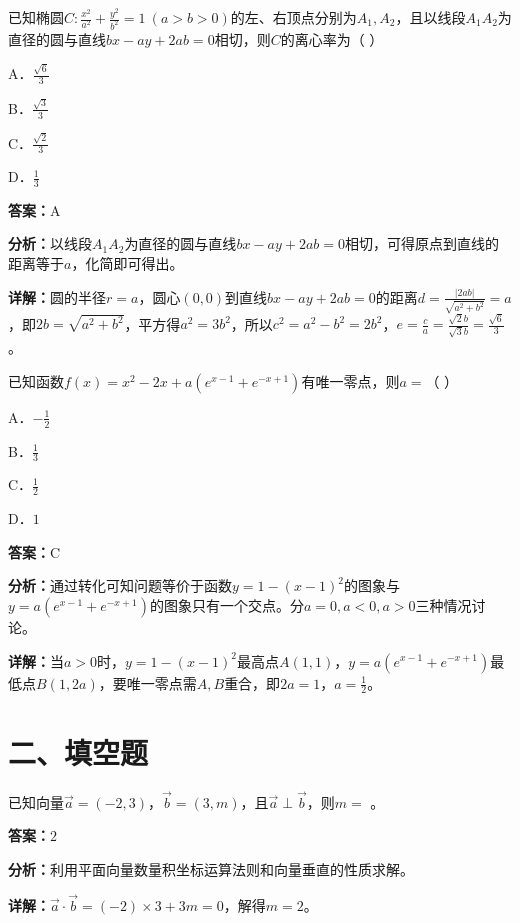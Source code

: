 \begin{question}[points=5]
已知椭圆$C:\frac{x^2}{a^2}+\frac{y^2}{b^2}=1\ (a>b>0)$的左、右顶点分别为$A_1,A_2$，且以线段$A_1A_2$为直径的圆与直线$bx-ay+2ab=0$相切，则$C$的离心率为（              ）
\begin{choices}
  \item A．$\frac{\sqrt{6}}{3}$
  \item B．$\frac{\sqrt{3}}{3}$
  \item C．$\frac{\sqrt{2}}{3}$
  \item D．$\frac{1}{3}$
\end{choices}
\begin{solution}
\textbf{答案：}A

\textbf{分析：}以线段$A_1A_2$为直径的圆与直线$bx-ay+2ab=0$相切，可得原点到直线的距离等于$a$，化简即可得出。

\textbf{详解：}圆的半径$r=a$，圆心$(0,0)$到直线$bx-ay+2ab=0$的距离$d=\frac{|2ab|}{\sqrt{a^2+b^2}}=a$，即$2b=\sqrt{a^2+b^2}$，平方得$a^2=3b^2$，所以$c^2=a^2-b^2=2b^2$，$e=\frac{c}{a}=\frac{\sqrt{2}b}{\sqrt{3}b}=\frac{\sqrt{6}}{3}$。
\end{solution}
\end{question}

\begin{question}[points=5]
已知函数$f(x)=x^2-2x+a(e^{x-1}+e^{-x+1})$有唯一零点，则$a=$（          ）
\begin{choices}
  \item A．$-\frac{1}{2}$
  \item B．$\frac{1}{3}$
  \item C．$\frac{1}{2}$
  \item D．$1$
\end{choices}
\begin{solution}
\textbf{答案：}C

\textbf{分析：}通过转化可知问题等价于函数$y=1-(x-1)^2$的图象与$y=a(e^{x-1}+e^{-x+1})$的图象只有一个交点。分$a=0,a<0,a>0$三种情况讨论。

\textbf{详解：}当$a>0$时，$y=1-(x-1)^2$最高点$A(1,1)$，$y=a(e^{x-1}+e^{-x+1})$最低点$B(1,2a)$，要唯一零点需$A,B$重合，即$2a=1$，$a=\frac{1}{2}$。
\end{solution}
\end{question}

\section*{二、填空题}

\begin{question}[points=5]
已知向量$\vec{a}=(-2,3)$，$\vec{b}=(3,m)$，且$\vec{a}\perp\vec{b}$，则$m=$        。
\fillin[{$2$}]
\begin{solution}
\textbf{答案：}$2$

\textbf{分析：}利用平面向量数量积坐标运算法则和向量垂直的性质求解。

\textbf{详解：}$\vec{a}\cdot\vec{b}=(-2)\times3+3m=0$，解得$m=2$。
\end{solution}
\end{question}

